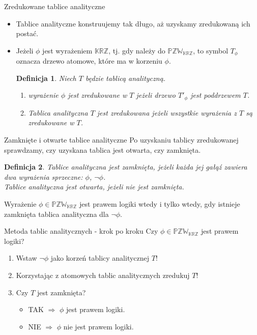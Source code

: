 \documentclass{beamer}
\newtheorem{definicja}{Definicja}
\newcommand {\KRZ} {\ensuremath{\mathbb{KRZ}}}
\newcommand {\PZWKRZ} {\ensuremath{\mathbb{PZW_{KRZ}}}}
\begin{document}
\begin{frame}{Zredukowane tablice analityczne}
\begin{itemize}
\item Tablice analityczne konstruujemy tak długo, aż uzyskamy zredukowaną ich postać.
%
\item Jeżeli $\phi$ jest wyrażeniem \KRZ, tj. gdy należy do \PZWKRZ, to symbol $T_{\phi}$ oznacza drzewo atomowe, które ma w korzeniu $\phi$.
%
\begin{definicja} Niech $T$ będzie tablicą analityczną.
\begin{enumerate}
\item wyrażenie $\phi$ jest \emph{zredukowane} w $T$ jeżeli drzewo $T'_{\phi}$ jest poddrzewem $T$.
\item Tablica analityczna $T$ jest \emph{zredukowana} jeżeli wszystkie wyrażenia z $T$ są zredukowane w $T$.
\end{enumerate}
\end{definicja}
\end{itemize}
\end{frame}

\begin{frame}{Zamknięte i otwarte tablice analityczne}
Po uzyskaniu tablicy zredukowanej sprawdzamy, czy uzyskana tablica jest otwarta, czy zamknięta.
%
\begin{definicja}
Tablice analityczna jest \emph{zamknięta}, jeżeli każda jej gałąź zawiera dwa wyrażenia sprzeczne: $\phi$, $\neg \phi$. \\
Tablice analityczna jest \emph{otwarta}, jeżeli nie jest zamknięta.
\end{definicja}
%
\begin{fact}
Wyrażenie $\phi \in \PZWKRZ$ jest prawem logiki wtedy i tylko wtedy, gdy istnieje zamknięta tablica analityczna dla $\neg \phi$.
\end{fact}
\end{frame}

\begin{frame}{Metoda tablic analitycznych - krok po kroku}
Czy $\phi \in \PZWKRZ$ jest prawem logiki?
%
\begin{enumerate}
\item Wstaw $\neg \phi$ jako korzeń tablicy analitycznej $T$!
%
\item Korzystając z atomowych tablic analitycznych zredukuj $T$!
%
\item Czy $T$ jest zamknięta?
%
\begin{itemize}
\item \textcolor[rgb]{0.00,1.00,0.00}{TAK} $\Longrightarrow$ $\phi$ \textcolor[rgb]{0.00,1.00,0.00}{jest} prawem logiki.
%
\item \textcolor[rgb]{1.00,0.00,0.00}{NIE} $\Longrightarrow$ $\phi$ \textcolor[rgb]{0.98,0.00,0.00}{nie jest} prawem logiki.
\end{itemize}
\end{enumerate}
\end{frame}
\end{document}
